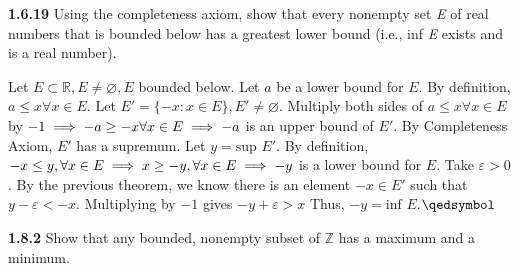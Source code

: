 \documentclass[12pt]{article}
\newcommand{\Z}{\mathbb{Z}}
\newcommand{\R}{\mathbb{R}}
\begin{document}
\begin{problem}\textbf{1.6.19}
Using the completeness axiom, show that every nonempty set \textit{E} of real numbers that is bounded below has a greatest lower bound (i.e., inf \textit{E} exists and is a real number).
\end{problem}
\begin{solution}\newline
Let $E\subset\R, E\neq\varnothing, E$ bounded below. Let $a$ be a lower bound for $E$.\newline
By definition, $a\leq x\forall x\in E$.\newline
Let $E'=\{-x:x\in E\}, E'\neq\varnothing$.\newline
Multiply both sides of $a\leq x\forall x\in E$ by $-1\implies -a\geq -x\forall x\in E\newline
\implies -a$ is an upper bound of $E'$.\newline
By Completeness Axiom, $E'$ has a supremum. Let $y=\text{sup }E'$.\newline
By definition, $-x\leq y,\forall x\in E\newline
\implies x\geq -y,\forall x\in E\newline
\implies -y$ is a lower bound for $E$.\newline
Take $\varepsilon>0$.\newline
By the previous theorem, we know there is an element $-x\in E'$ such that $y-\varepsilon<-x$.\newline
Multiplying by $-1$ gives $-y+\varepsilon>x$\newline
Thus, $-y=\text{inf }E$.\flushright$\qedsymbol$


\end{solution}
\newpage
\begin{problem}\textbf{1.8.2}
Show that any bounded, nonempty subset of $\Z$ has a maximum and a minimum.
\end{problem}
\end{document}
